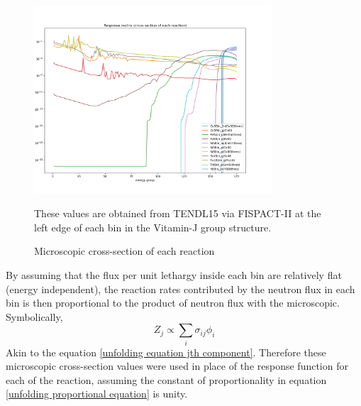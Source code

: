 \documentclass[a4paper, 12pt]{article}
\begin{document}
\begin{figure}
\centering
\includegraphics[height=7cm]{PPT/response_matrix.png}
\caption{Microscopic cross-section of each reaction}\label{response_matrix}
These values are obtained from TENDL15 via FISPACT-II \cite{FISPACT} at the left edge of each bin in the Vitamin-J group structure. 
\end{figure}
By assuming that the flux per unit lethargy inside each bin are relatively flat (energy independent), the reaction rates contributed by the neutron flux in each bin is then proportional to the product of neutron flux with the microscopic. Symbolically,
\begin{equation} \label{unfolding proportional equation}
    Z_j \propto \sum_i \sigma_{ij} \phi_i
\end{equation}
Akin to the equation \ref{unfolding equation jth component}. Therefore these microscopic cross-section values were used in place of the response function for each of the reaction, assuming the constant of proportionality in equation \ref{unfolding proportional equation} is unity.
\end{document}
